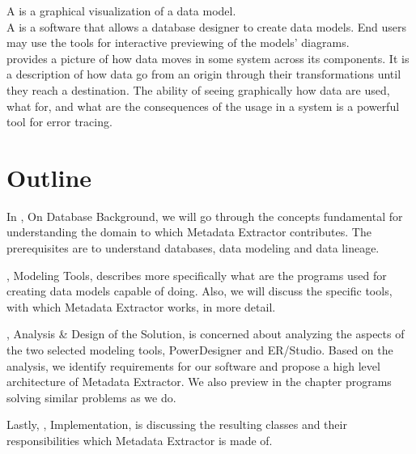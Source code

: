 A  is a graphical visualization of a data model. \\

A  is a software that allows a database designer to create data models. End users may use the tools for interactive previewing of the models' diagrams. \\

 provides a picture of how data moves in some system across its components. It is a description of how data go from an origin through their transformations until they reach a destination. 
The ability of seeing graphically how data are used, what for, and what are the consequences of the usage in a system is a powerful tool for error tracing. \\

\section{Outline}

In , On Database Background, we will go through the concepts fundamental for understanding the domain to which Metadata Extractor contributes. The prerequisites are to understand databases, data modeling and data lineage.

, Modeling Tools, describes more specifically what are the programs used for creating data models capable of doing.
Also, we will discuss the specific tools, with which Metadata Extractor works, in more detail.

, Analysis \& Design of the Solution, is concerned about analyzing the aspects of the two selected modeling tools, PowerDesigner and ER/Studio. 
Based on the analysis, we identify requirements for our software and propose a high level architecture of Metadata Extractor. 
We also preview in the chapter programs solving similar problems as we do.

Lastly, , Implementation, is discussing the resulting classes and their responsibilities which Metadata Extractor is made of.


